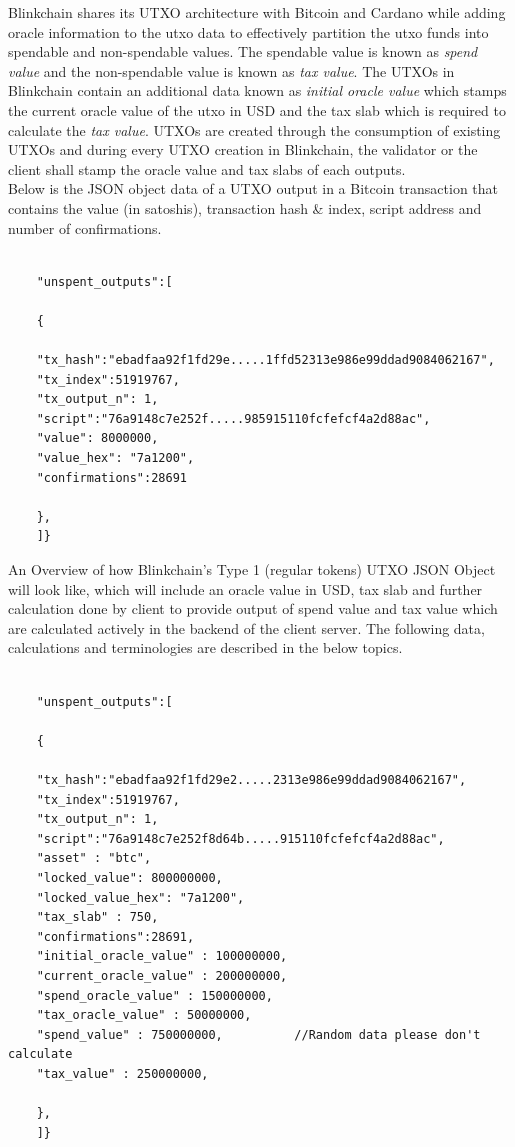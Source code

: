 \documentclass[letterpaper,11pt]{article}
\begin{document}
Blinkchain shares its UTXO architecture with Bitcoin and Cardano while adding oracle information to the utxo data to effectively partition the utxo funds into spendable and non-spendable values. The spendable value is known as \textit{spend value} and the non-spendable value is known as \textit{tax value}. The UTXOs in Blinkchain contain an additional data known as \textit{initial oracle value} which stamps the current oracle value of the utxo in USD and the tax slab which is required to calculate the \textit{tax value}. UTXOs are created through the consumption of existing UTXOs and during every UTXO creation in Blinkchain, the validator or the client shall stamp the oracle value and tax slabs of each outputs.\\

Below is the JSON object data of a UTXO output in a Bitcoin transaction that contains the value (in satoshis), transaction hash \& index, script address and number of confirmations.\\

\begin{lstlisting}[caption={Bitcoin UTXO JSON Object Data}, numbers=none]

    "unspent_outputs":[
    
	{
	
	"tx_hash":"ebadfaa92f1fd29e.....1ffd52313e986e99ddad9084062167",
	"tx_index":51919767,
	"tx_output_n": 1,
	"script":"76a9148c7e252f.....985915110fcfefcf4a2d88ac",
	"value": 8000000,
	"value_hex": "7a1200",
	"confirmations":28691
	
	},
	]}
\end{lstlisting}

An Overview of how Blinkchain's Type 1 (regular tokens) UTXO JSON Object will look like, which will include an oracle value in USD, tax slab and further calculation done by client to provide output of spend value and tax value which are calculated actively in the backend of the client server. The following data, calculations and terminologies are described in the below topics.

\begin{lstlisting}[caption={Blinkchain Type 1 UTXO JSON Object Data}, numbers=none]

    "unspent_outputs":[
    
	{
	
	"tx_hash":"ebadfaa92f1fd29e2.....2313e986e99ddad9084062167",
	"tx_index":51919767,
	"tx_output_n": 1,
	"script":"76a9148c7e252f8d64b.....915110fcfefcf4a2d88ac",
	"asset" : "btc",
	"locked_value": 800000000,
	"locked_value_hex": "7a1200",
	"tax_slab" : 750,
	"confirmations":28691,
	"initial_oracle_value" : 100000000,
	"current_oracle_value" : 200000000,
	"spend_oracle_value" : 150000000,
	"tax_oracle_value" : 50000000,
	"spend_value" : 750000000, 			//Random data please don't calculate
	"tax_value" : 250000000,
	
	},
	]}
\end{lstlisting}
\end{document}
